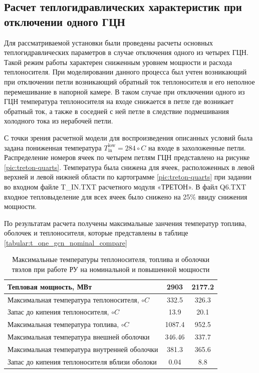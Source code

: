 
\subsection{Расчет теплогидравлических характеристик при отключении одного ГЦН}
Для рассматриваемой установки были проведены расчеты основных теплогидравлических параметров в случае отключения одного из четырех ГЦН. Такой режим работы характерен сниженным уровнем мощности и расхода теплоносителя. При моделировании данного процесса был учтен возникающий при отключении петли возникающий обратный ток теплоносителя и его неполное перемешивание в напорной камере. В таком случае при отключении одного из ГЦН температура теплоносителя на входе снижается в петле где возникает обратный ток, а также в соседней с ней петле в следствие подмешивания холодного тока из нерабочей петли. 

С точки зрения расчетной модели для воспроизведения описанных условий была задана пониженная температура $T_{\text{in}}^{\text{low}}=284 \circ C$ на входе в захоложенные петли. Распределение номеров ячеек по четырем петлям ГЦН представлено на рисунке \ref{pic:treton-quarts}. Температура была снижена для ячеек, расположенных в левой верхней и левой нижней области по картограмме \ref{pic:treton-quarts} при задании во входном файле T\_IN.TXT расчетного модуля «ТРЕТОН». В файл Q6.TXT входное тепловыделение для всех ячеек было снижено на 25\% ввиду снижения мощности. 

По результатам расчета получены максимальные занчения температур топлива, оболочек и теплоносителя, которые представлены в таблице \ref{tabular:t_one_gcn_nominal_compare}

\begin{table}[H]
    \caption{Максимальные температуры теплоносителя, топлива и оболочки твэлов при работе РУ на номинальной и повышенной мощности}
    \begin{center}
        \begin{tabular}{|l|c|c|}
        \toprule
        Тепловая мощность, МВт & 2903 & 2177.2 \\
        \midrule
        \hline
        Максимальная температура теплоносителя, $\circ C$ & 332.5 & 326.3  \\ 
        \hline
        Запас до кипения теплоносителя, $\circ C$ & 13.9 &  20.1 \\
        \hline
        Максимальная температура топлива, $\circ C$ & 1087.4 & 952.5  \\
        \hline
        Максимальная температура внешней оболочки & 346.46 & 337.7 \\
        \hline
        Максимальная температура внутренней оболочки & 381.3 & 365.6 \\
        \hline
        Запас до кипения теплоносителя вблизи оболоки & 0.04 & 8.8 \\
        \bottomrule
        \end{tabular}
		\label{tabular:t-one-gcn-nominal-compare}
    \end{center}
\end{table}

